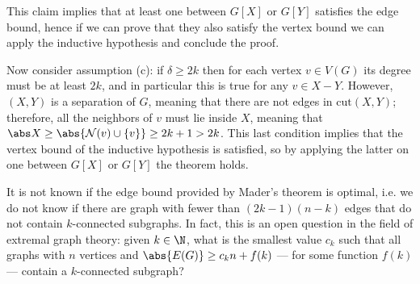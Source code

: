 \documentclass[a4paper, 12pt]{report}
\begin{document}
{        

        This claim implies that at least one between $G[X]$ or $G[Y]$ satisfies the edge bound, hence if we can prove that they also satisfy the vertex bound we can apply the inductive hypothesis and conclude the proof.

        Now consider assumption (c): if $\delta \ge 2k$ then for each vertex $v \in V(G)$ its degree must be at least $2k$, and in particular this is true for any $v \in X - Y$. However, $(X, Y)$ is a separation of $G$, meaning that there are not edges in $\mathrm{cut}(X, Y)$; therefore, all the neighbors of $v$ must lie inside $X$, meaning that $\abs X \ge \abs{\mathcal N(v) \cup \{v\}} \ge 2k + 1 > 2k$. This last condition implies that the vertex bound of the inductive hypothesis is satisfied, so by applying the latter on one between $G[X]$ or $G[Y]$ the theorem holds.
    }

    It is not known if the edge bound provided by Mader's theorem is optimal, i.e. we do not know if there are graph with fewer than $(2k - 1)(n - k)$ edges that do not contain $k$-connected subgraphs. In fact, this is an open question in the field of extremal graph theory: given $k \in \N$, what is the smallest value $c_k$ such that all graphs with $n$ vertices and $\abs{E(G)} \ge c_kn + f(k)$ --- for some function $f(k)$ --- contain a $k$-connected subgraph?
\end{document}

